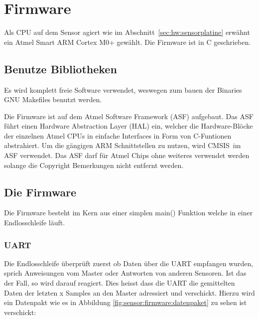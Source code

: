 \section{Firmware \Sensor}
\label{sec:firmware:sensor}

Als  CPU auf  dem  Sensor agiert  wie im  Abschnitt~\ref{sec:hw:sensorplatine}
erw\"ahnt ein  Atmel Smart ARM  Cortex M0+ gew\"ahlt.   Die Firmware ist  in C
geschrieben.

\subsection{Benutze Bibliotheken}

Es wird komplett freie Software verwendet, weswegen zum bauen der Binaries GNU Makefiles benutzt werden.

Die Firmware ist auf dem Atmel Software Framework (ASF) aufgebaut. Das ASF f\"uhrt einen Hardware Abstraction Layer (HAL) ein, welcher die Hardware-Bl\"ocke der einzelnen Atmel CPUs in einfache Interfaces in Form von C-Funtionen abstrahiert.
Um die g\"angigen ARM Schnittstellen zu nutzen, wird CMSIS im ASF verwendet.
Das ASF darf f\"ur Atmel Chips ohne weiteres verwendet werden solange die Copyright Bemerkungen nicht entfernt werden.

\subsection{Die Firmware}

Die Firmware besteht im Kern aus einer simplen main() Funktion welche in einer Endlosschleife l\"auft.

\subsubsection{UART}
\label{subs:UART}

Die Endlosschleife \"uberpr\"uft zuerst ob Daten \"uber die UART empfangen wurden, sprich Anweisungen vom Master oder Antworten von anderen Sensoren. Ist das der Fall, so wird darauf reagiert. Dies heisst dass die UART die gemittelten Daten der letzten x Samples an den Master adressiert und verschickt.
Hierzu wird ein Datenpakt wie es in Abbildung \ref{fig:sensor:firmware:datenpaket} zu sehen ist verschickt:

